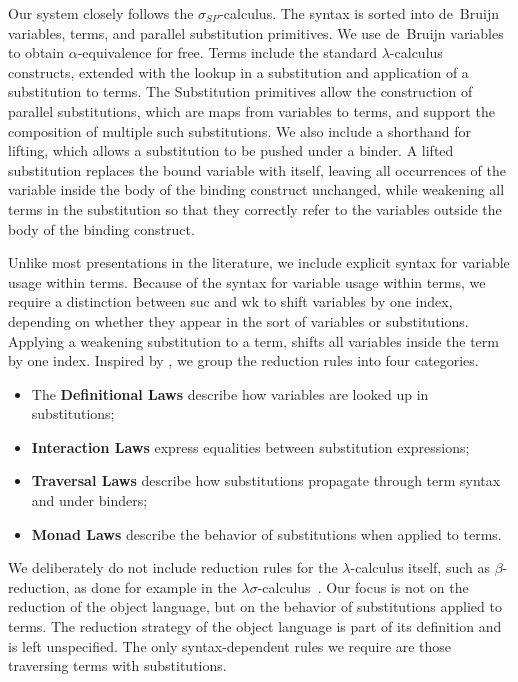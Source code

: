 \documentclass[screen,nonacm]{acmart}
\newcommand{\bsym}[1]{\textcolor{agdablue}{#1}}
\begin{document}
Our system closely follows the $σ_{SP}$-calculus. The syntax is sorted into
de~Bruijn variables, terms, and parallel substitution primitives. We use
de~Bruijn variables to obtain $α$-equivalence for free. Terms include the
standard $λ$-calculus constructs, extended with the lookup in a substitution
and application of a substitution to terms. The Substitution primitives allow
the construction of parallel substitutions, which are maps from variables to
terms, and support the composition of multiple such substitutions. We also
include a shorthand for lifting, which allows a substitution to be pushed under
a binder. A lifted substitution replaces the bound variable with itself,
leaving all occurrences of the variable inside the body of the binding
construct unchanged, while weakening all terms in the substitution so that they
correctly refer to the variables outside the body of the binding construct.

Unlike most presentations in the literature, we include explicit syntax for
variable usage within terms. Because of the syntax for variable usage within
terms, we require a distinction between \bsym{\textsf{suc}} and
\bsym{\textsf{wk}} to shift variables by one index, depending on whether they
appear in the sort of variables or substitutions. Applying a weakening
substitution to a term, shifts all variables inside the term by one index.
Inspired by \citet{Stark:2020:Mechanising}, we group the reduction rules into
four categories.
\begin{itemize}
      \item The \textbf{Definitional Laws} describe how variables are looked up in
            substitutions;
      \item \textbf{Interaction Laws} express equalities between substitution expressions;
      \item \textbf{Traversal Laws} describe how substitutions propagate through term syntax and under binders;
      \item \textbf{Monad Laws} describe the behavior of substitutions when applied to
            terms.
\end{itemize}

\noindent We deliberately do not include reduction rules for the $λ$-calculus itself, such as
$β$-reduction, as done for example in the $λσ$-calculus~\cite{10.1145/226643.226675}.
Our focus is not on the reduction of the object language, but on the behavior
of substitutions applied to terms. The reduction strategy of the object
language is part of its definition and is left unspecified.
The only syntax-dependent rules we require are those traversing terms with substitutions.
\end{document}
